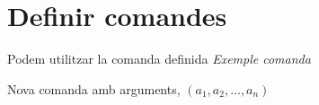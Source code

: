 \chapter{Definir comandes}

\newcommand{\exCom}{\textsl{Exemple comanda}}

Podem utilitzar la comanda definida \exCom{}

\newcommand{\vect}[1]{(#1_1,#1_2,\dots,#1_n)}

Nova comanda amb arguments, $\vect{a}$